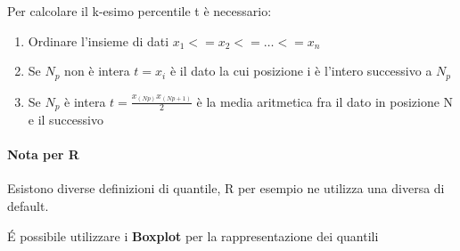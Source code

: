 Per calcolare il k-esimo percentile t è necessario:
\begin{enumerate}
    \item Ordinare l'insieme di dati $x_1 <= x_2 <= \dots <= x_n$
    \item Se $N_p$ non è intera $t=x_i$ è il dato la cui posizione i è l'intero successivo a $N_p$
    \item Se $N_p$ è intera $t = \frac{x_(Np) x_(Np+1)}{2}$ è la media aritmetica fra il dato in posizione N e il successivo 
\end{enumerate}

\paragraph{Nota per R} Esistono diverse definizioni di quantile, R per esempio ne utilizza una diversa di default.

\'E possibile utilizzare i \textbf{Boxplot} per la rappresentazione dei quantili
